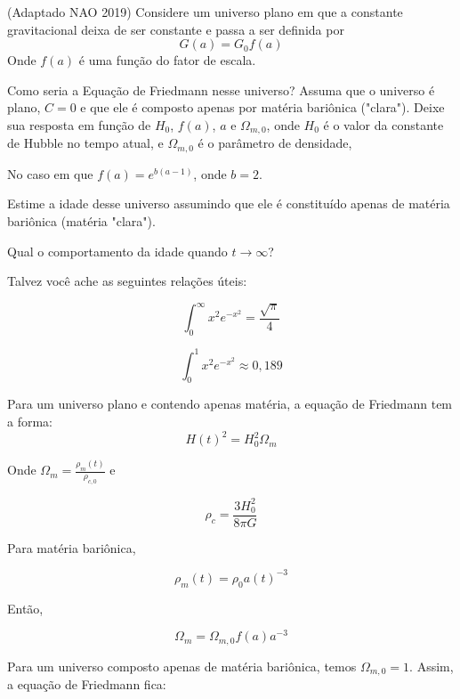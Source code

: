 \documentclass[11pt]{article}
\begin{document}
\begin{pproblem}(Adaptado NAO 2019) 
    Considere um universo plano em que a constante gravitacional deixa de ser constante e passa a ser definida por
    \[G(a) = G_0 f(a)\]
    Onde \(f(a)\) é uma função do fator de escala.
    \begin{alternativas}
        \item Como seria a Equação de Friedmann nesse universo? Assuma que o universo é plano, \(C = 0\) e que ele é composto apenas por matéria bariônica ("clara"). Deixe sua resposta em função de \(H_0\), \(f(a)\), \(a\) e \(\Omega_{m,0}\), onde \(H_0\) é o valor da constante de Hubble no tempo atual, e \(\Omega_{m,0}\) é o parâmetro de densidade,
        
        No caso em que \(f(a) = e^{b(a-1)}\), onde \(b=2\).
        
        \item Estime a idade desse universo assumindo que ele é constituído apenas de matéria bariônica (matéria "clara").
                
        \item Qual o comportamento da idade quando \(t \rightarrow \infty\)?
    \end{alternativas}

    Talvez você ache as seguintes relações úteis:
    \begin{paracol}{2}
        \[\int_0^\infty x^2 e^{-x^2} = \frac{\sqrt{\pi}}{4}\]

        \switchcolumn

        \[\int_0^1 x^2 e^{-x^2} \approx 0,189\]
    \end{paracol}

\begin{pssolution*}{}{ }
    \begin{alternativas}
        \item Para um universo plano e contendo apenas matéria, a equação de Friedmann tem a forma:
        \[H(t)^2 = H_0^2 \Omega_m\]

        Onde \(\Omega_m = \frac{\rho_m(t)}{\rho_{c, 0}}\) e 

        \[\rho_c = \frac{3 H_0^2}{8\pi G}\]

        Para matéria bariônica,

        \[\rho_m(t) = \rho_0 a(t)^{-3}\]

        Então,

        \[\Omega_m = \Omega_{m,0} f(a) a^{-3}\]

        Para um universo composto apenas de matéria bariônica, temos \(\Omega_{m,0} = 1\). Assim, a equação de Friedmann fica:


\end{alternativas}
\end{pssolution*}
\end{pproblem}
\end{document}
